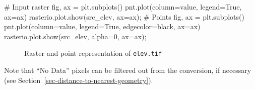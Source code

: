 \documentclass[
  letterpaper,
]{krantz}
\newenvironment{Shaded}{\begin{snugshade}}{\end{snugshade}}
\newcommand{\CommentTok}[1]{\textcolor[rgb]{0.37,0.37,0.37}{#1}}
\newcommand{\DecValTok}[1]{\textcolor[rgb]{0.68,0.00,0.00}{#1}}
\newcommand{\NormalTok}[1]{\textcolor[rgb]{0.00,0.23,0.31}{#1}}
\newcommand{\OperatorTok}[1]{\textcolor[rgb]{0.37,0.37,0.37}{#1}}
\newcommand{\StringTok}[1]{\textcolor[rgb]{0.13,0.47,0.30}{#1}}
\newcommand{\VariableTok}[1]{\textcolor[rgb]{0.07,0.07,0.07}{#1}}
\begin{document}
\begin{Shaded}
\begin{Highlighting}[]
\CommentTok{\# Input raster}
\NormalTok{fig, ax }\OperatorTok{=}\NormalTok{ plt.subplots()}
\NormalTok{pnt.plot(column}\OperatorTok{=}\StringTok{\textquotesingle{}value\textquotesingle{}}\NormalTok{, legend}\OperatorTok{=}\VariableTok{True}\NormalTok{, ax}\OperatorTok{=}\NormalTok{ax)}
\NormalTok{rasterio.plot.show(src\_elev, ax}\OperatorTok{=}\NormalTok{ax)}\OperatorTok{;}
\CommentTok{\# Points}
\NormalTok{fig, ax }\OperatorTok{=}\NormalTok{ plt.subplots()}
\NormalTok{pnt.plot(column}\OperatorTok{=}\StringTok{\textquotesingle{}value\textquotesingle{}}\NormalTok{, legend}\OperatorTok{=}\VariableTok{True}\NormalTok{, edgecolor}\OperatorTok{=}\StringTok{\textquotesingle{}black\textquotesingle{}}\NormalTok{, ax}\OperatorTok{=}\NormalTok{ax)}
\NormalTok{rasterio.plot.show(src\_elev, alpha}\OperatorTok{=}\DecValTok{0}\NormalTok{, ax}\OperatorTok{=}\NormalTok{ax)}\OperatorTok{;}
\end{Highlighting}
\end{Shaded}

\begin{figure}

\begin{minipage}{0.50\linewidth}



\end{minipage}%
%
\begin{minipage}{0.50\linewidth}



\end{minipage}%

\caption{\label{fig-raster-to-points}Raster and point representation of
\texttt{elev.tif}}

\end{figure}%

Note that ``No Data'' pixels can be filtered out from the conversion, if
necessary (see Section~\ref{sec-distance-to-nearest-geometry}).
\end{document}
